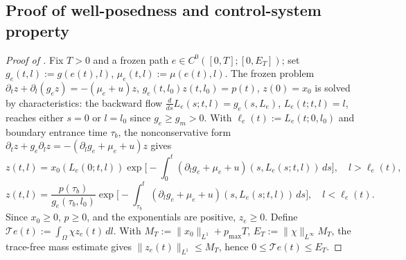 \documentclass[a4paper,fleqn,longmktitle]{cas-sc}
\theoremstyle{plain}
\theoremstyle{definition}
\theoremstyle{remark}
\numberwithin{equation}{section}
\begin{document}
\subsection{Proof of well-posedness and control-system property}
\label{subsec:proof_wellposedness}
\begin{proof}[Proof of ]
Fix \(T>0\) and a frozen path \(e\in C^0([0,T];[0,E_T])\); set
\(g_e(t,l):=g(e(t),l)\), \(\mu_e(t,l):=\mu(e(t),l)\). The frozen problem
\(\partial_t z+\partial_l(g_ez)=-(\mu_e+u)z\),
\(g_e(t,l_0)z(t,l_0)=p(t)\), \(z(0)=x_0\) is solved by characteristics: the
backward flow \(\frac{d}{ds}L_e(s;t,l)=g_e(s,L_e)\), \(L_e(t;t,l)=l\), reaches
either \(s=0\) or \(l=l_0\) since \(g_e\ge g_m>0\). With
\(\ell_e(t):=L_e(t;0,l_0)\) and boundary entrance time \(\tau_b\), the
nonconservative form \(\partial_t z+g_e\partial_lz=-(\partial_lg_e+\mu_e+u)z\)
gives
\[
    z(t,l)
    =
    x_0(L_e(0;t,l))
    \exp\!\Big[-\!\int_0^t(\partial_lg_e+\mu_e+u)(s,L_e(s;t,l))\,ds\Big],
    \quad l>\ell_e(t),
\]
\[
    z(t,l)
    =
    \frac{p(\tau_b)}{g_e(\tau_b,l_0)}
    \exp\!\Big[-\!\int_{\tau_b}^t(\partial_lg_e+\mu_e+u)(s,L_e(s;t,l))\,ds\Big],
    \quad l<\ell_e(t).
\]
Since \(x_0\ge0\), \(p\ge0\), and the exponentials are positive, \(z_e\ge0\).
Define \(\mathcal T e(t):=\int_\Omega\chi z_e(t)\,dl\). With
\(M_T:=\|x_0\|_{L^1}+p_{\max}T\), \(E_T:=\|\chi\|_{L^\infty}M_T\), the trace-free
mass estimate gives \(\|z_e(t)\|_{L^1}\le M_T\), hence
\(0\le\mathcal T e(t)\le E_T\).


\end{proof}
\end{document}
